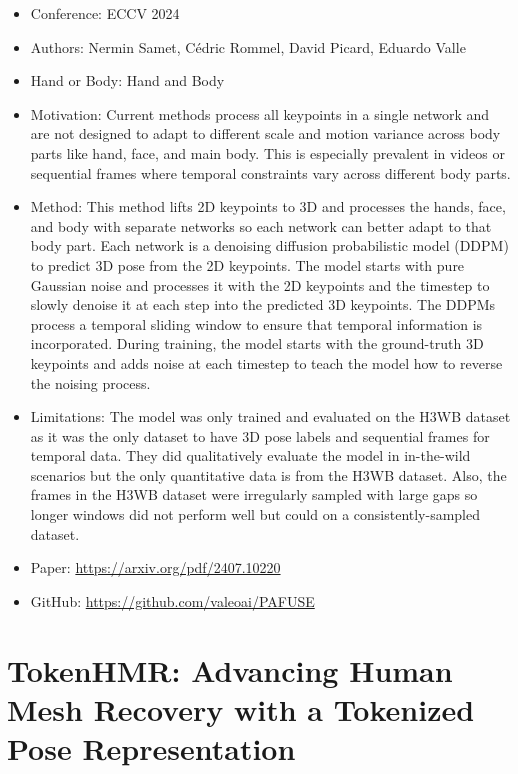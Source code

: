 \documentclass{article}
\begin{document}
\begin{itemize}
    \item Conference: ECCV 2024
    \item Authors: Nermin Samet, Cédric Rommel, David Picard, Eduardo Valle
    \item Hand or Body: Hand and Body
    \item Motivation: Current methods process all keypoints in a single network and are not designed to adapt to different scale and motion variance across body parts like hand, face, and main body. This is especially prevalent in videos or sequential frames where temporal constraints vary across different body parts.
    \item Method: This method lifts 2D keypoints to 3D and processes the hands, face, and body with separate networks so each network can better adapt to that body part. Each network is a denoising diffusion probabilistic model (DDPM) to predict 3D pose from the 2D keypoints. The model starts with pure Gaussian noise and processes it with the 2D keypoints and the timestep to slowly denoise it at each step into the predicted 3D keypoints. The DDPMs process a temporal sliding window to ensure that temporal information is incorporated. During training, the model starts with the ground-truth 3D keypoints and adds noise at each timestep to teach the model how to reverse the noising process.
    \item Limitations: The model was only trained and evaluated on the H3WB dataset as it was the only dataset to have 3D pose labels and sequential frames for temporal data. They did qualitatively evaluate the model in in-the-wild scenarios but the only quantitative data is from the H3WB dataset. Also, the frames in the H3WB dataset were irregularly sampled with large gaps so longer windows did not perform well but could on a consistently-sampled dataset.
    \item Paper: \url{https://arxiv.org/pdf/2407.10220}
    \item GitHub: \url{https://github.com/valeoai/PAFUSE}
\end{itemize}

\section*{TokenHMR: Advancing Human Mesh Recovery with a Tokenized Pose Representation}
\end{document}
